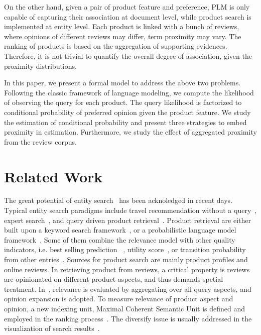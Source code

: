 \documentclass[preprint]{elsarticle}
\begin{document}
On the other hand, given a pair of product feature and preference, PLM is only capable of capturing their association at document level, while product search is implemented at entity level. Each product is linked with a bunch of reviews, where opinions of different reviews may differ, term proximity may vary. The ranking of products is based on the aggregation of supporting evidences. Therefore, it is not trivial to quantify the overall degree of association, given the proximity distributions.

In this paper, we present a formal model to address the above two problems. Following the classic framework of language modeling, we compute the likelihood of observing the query for each product. The query likelihood is factorized to conditional probability of preferred opinion given the product feature. We study the estimation of conditional probability and present three strategies to embed proximity in estimation. Furthermore, we study the effect of aggregated proximity from the review corpus.

\section{Related Work}\label{sec:related}

The great potential of entity search~\cite{Yao2013Unified} has been acknoledged in recent days. Typical entity search paradigms include travel recommendation without a query~\cite{Levi2012Finding}, expert search~\cite{Balog2006Formal}, and query driven product retrieval~\cite{Ganesan2012Opinion,Choi2012CONSENTO,Chen2011Diversifying, Vandic2013Facet, Ganti2010Keyword, Duan2013Supporting}. Product retrieval are either built upon a keyword search framework~\cite{Ganti2010Keyword, Duan2013Supporting}, or a probabilistic language model framework~\cite{Ganesan2012Opinion}. Some of them combine the relevance model with other quality indicators, i.e. best selling prediction ~\cite{Long2012Enhancing}, utility score~\cite{Li2011Towards}, or transition probability from other entries~\cite{Bordino2013Penguins}. Sources for product search are mainly product profiles and online reviews. In retrieving product from reviews, a critical property is reviews are opinionated on different product aspects, and thus demands spetial treatment. In~\cite{Ganesan2012Opinion}, relevance is evaluated by aggregating over all query aspects, and opinion expansion is adopted. To measure relevance of product aspect and opinion, a new indexing unit, Maximal Coherent Semantic Unit is defined and employed in the ranking process~\cite{Choi2012CONSENTO}. The diversify issue is usually addressed in the visualization of search results~\cite{Chen2011Diversifying, Vandic2013Facet}.
\end{document}
